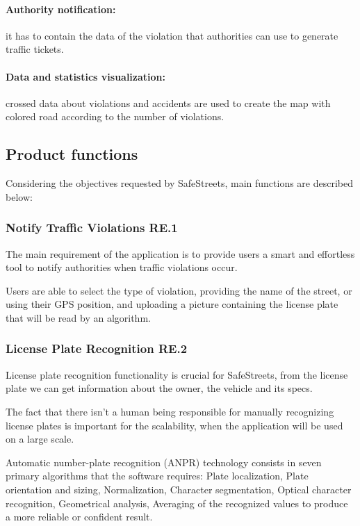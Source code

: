 \paragraph{Authority notification:} it has to contain the data of the violation that authorities can use to generate traffic tickets.

\paragraph{Data and statistics visualization:} crossed data about violations and accidents are used to create the map with colored road according to the number of violations.

\subsection{Product functions}
Considering the objectives requested by SafeStreets, main functions are described below:

\subsubsection{Notify Traffic Violations RE.1}
The main requirement of the application is to provide users a smart and effortless tool to notify authorities when traffic violations occur.

Users are able to select the type of violation, providing the name of the street, or using their GPS position, and uploading a picture containing the license plate that will be read by an algorithm.

\subsubsection{License Plate Recognition RE.2}
License plate recognition functionality is crucial for SafeStreets, from the license plate we can get information about the owner, the vehicle and its specs.

The fact that there isn't a human being responsible for manually recognizing license plates is important for the scalability, when the application will be used on a large scale.

Automatic number-plate recognition (ANPR) technology consists in seven primary algorithms that the software requires: Plate localization, Plate orientation and sizing, Normalization, Character segmentation, Optical character recognition, Geometrical analysis, Averaging of the recognized values to produce a more reliable or confident result.

